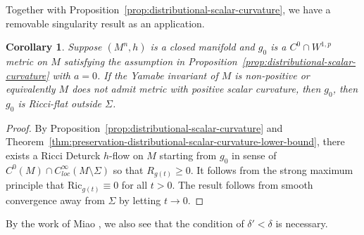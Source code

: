 \documentclass[12pt]{amsart}
\theoremstyle{plain}
\theoremstyle{plain}
\newtheorem{corollary}[subsection]{Corollary}
\theoremstyle{definition}
\theoremstyle{remark}
\numberwithin{equation}{subsection}
\newcommand{\hdel}{\tilde{\nabla}}
\begin{document}
%
%

Together with Proposition~\ref{prop:distributional-scalar-curvature}, we have a removable singularity result as an application.

\begin{corollary}\label{thm:non-cpt-dist-scalar-curvature-lower-bdd}
Suppose $(M^n,h)$ is a closed manifold and $g_0$ is a $C^0\cap W^{1,p}$ metric on $M$ satisfying the assumption in Proposition~\ref{prop:distributional-scalar-curvature} with $a=0$. If the Yamabe invariant of $M$ is non-positive or equivalently $M$ does not admit metric with positive scalar curvature, then $g_0$, then $g_0$ is Ricci-flat outside $\Sigma$.
\end{corollary}
\begin{proof}
By Proposition~\ref{prop:distributional-scalar-curvature} and Theorem~\ref{thm:preservation-distributional-scalar-curvature-lower-bound}, there exists a Ricci Deturck $h$-flow on $M$ starting from $g_0$ in sense of  $C^0(M)\cap C^\infty_{loc}(M\setminus\Sigma)$ so that $R_{g(t)}\geq 0$.  It follows from the strong maximum principle that $\mathrm{Ric}_{g(t)}\equiv 0$ for all $t>0$. The result follows from smooth convergence away from $\Sigma$ by letting $t\to0$.
\end{proof}
By the work of Miao \cite{miao_positive_2003}, we also see that the condition of $\delta'<\delta$ is necessary.


\printbibliography[title=References]
\end{document}
